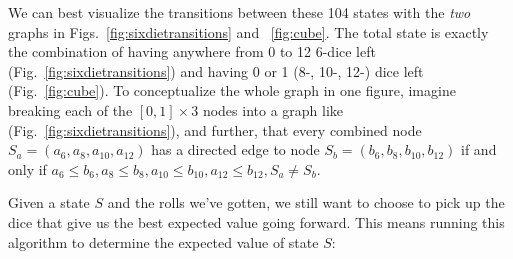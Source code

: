 \documentclass[11pt, oneside]{article} 	%
\begin{document}
We can best visualize the transitions between these 104 states with the \emph{two} graphs in Figs.~\ref{fig:sixdietransitions} and ~\ref{fig:cube}.  The total state is exactly the combination of having anywhere from 0 to 12 6-dice left (Fig.~\ref{fig:sixdietransitions}) and having 0 or 1 (8-, 10-, 12-) dice left (Fig.~\ref{fig:cube}).  To conceptualize the whole graph in one figure, imagine breaking each of the $[0,1] \times 3$ nodes into a graph like (Fig.~\ref{fig:sixdietransitions}), and further, that every combined node $S_a = (a_6, a_8, a_{10}, a_{12})$ has a directed edge to node $S_b = (b_6, b_8, b_{10}, b_{12})$ if and only if $a_6 \leq b_6, a_8 \leq b_8, a_{10} \leq b_{10}, a_{12} \leq b_{12}, S_a \neq S_b$.

Given a state $S$ and the rolls we've gotten, we still want to choose to pick up the dice that give us the best expected value going forward.  This means running this algorithm to determine the expected value of state $S$:

\end{document}
